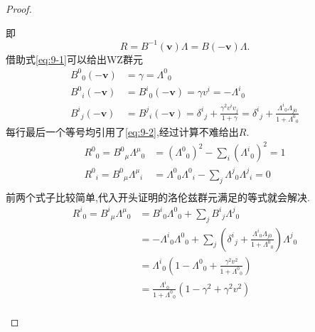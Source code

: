 \documentclass[../main.tex]{subfiles}
\begin{document}
\begin{proof}
\begin{enumerate}
		      即 \[
			      R = B^{-1}(\bm{v})\Lambda = B(-\bm{v})\Lambda
			      .\]借助式\ref{eq:9-1}可以给出WZ群元
		      \begin{align*}
			      B^{0}{}_0(-\bm{v}) & = \gamma = \Lambda^{0}{}_{0}                                                                                                                              \\
			      B^{0}{}_i(-\bm{v}) & =B^{i}{}_0(-\bm{v}) = \gamma v^i = -\Lambda^{i}{}_{0}                                                                                                     \\
			      B^{i}{}_j(-\bm{v}) & = B^{j}{}_i(-\bm{v}) = \delta^{i}{}_j + \frac{\gamma^2 v^i v_j}{1+\gamma} = \delta^{i}{}_{j} + \frac{\Lambda^{i}{}_{0}\Lambda_{j0}}{1+ \Lambda^{0}{}_{0}}
		      \end{align*}
		      每行最后一个等号均引用了\ref{eq:9-2},经过计算不难给出$R$.
		      \begin{align*}
			      R^{0}{}_{0}  = B^{0}{}_{\mu}\Lambda^{\mu}{}_{0} & =  (\Lambda^{0}{}_{0})^2 - \sum_i (\Lambda^{i}{}_{0})^2 = 1                         \\
			      R^{0}{}_{i}  = B^{0}{}_{\mu}\Lambda^{\mu}{}_{i} & =\Lambda^{0}{}_{0} \Lambda^{0}{}_{i} - \sum_j \Lambda^{j}{}_{0}\Lambda^{j}{}_{i}= 0 \\
		      \end{align*}
		      前两个式子比较简单,代入开头证明的洛伦兹群元满足的等式就会解决.
		      \begin{align*}
			      R^{i}{}_{0} = B^{i}{}_{\mu}\Lambda^{\mu}{}_{0} & =B^{i}{}_{0} \Lambda^{0}{}_{0} + \sum_j B^{i}{}_{j}\Lambda^{j}{}_{0}                                                         \\
			                                                     & =-\Lambda^{i}{}_{0}\Lambda^{0}{}_{0} + \sum_j (\delta^{i}{}_{j} + \frac{\Lambda^{i}{}_{0}\Lambda_{j0}}{1+ \Lambda^{0}{}_{0}}
			      )\Lambda^{j}{}_{0}                                                                                                                                                            \\
			                                                     & = \Lambda^{i}{}_{0}(1 - \Lambda^{0}{}_{0} + \frac{\gamma^2v^2}{1 + \Lambda^{0}{}_{0}})                                       \\
			                                                     & =\frac{\Lambda^{i}{}_{0}}{1 + \Lambda^{0}{}_{0}}(1 - \gamma^2 + \gamma^2v^2)                                                 \\

\end{align*}
\end{enumerate}
\end{proof}
\end{document}
